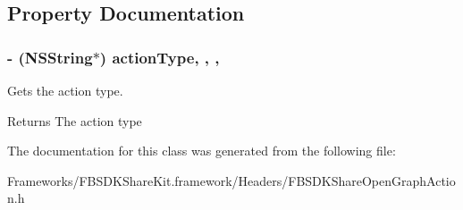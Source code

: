 \subsection{Property Documentation}
\hypertarget{interface_f_b_s_d_k_share_open_graph_action_ae9d368ff0aa61e07a34cf9891244e0f9}{}
\subsubsection[{action\+Type}]{\setlength{\rightskip}{0pt plus 5cm}-\/ (N\+S\+String$\ast$) action\+Type\hspace{0.3cm}{\ttfamily [read]}, {\ttfamily [write]}, {\ttfamily [nonatomic]}, {\ttfamily [copy]}}\label{interface_f_b_s_d_k_share_open_graph_action_ae9d368ff0aa61e07a34cf9891244e0f9}
Gets the action type. \begin{DoxyReturn}{Returns}
The action type 
\end{DoxyReturn}


The documentation for this class was generated from the following file\+:\begin{DoxyCompactItemize}
\item 
Frameworks/\+F\+B\+S\+D\+K\+Share\+Kit.\+framework/\+Headers/F\+B\+S\+D\+K\+Share\+Open\+Graph\+Action.\+h\end{DoxyCompactItemize}
